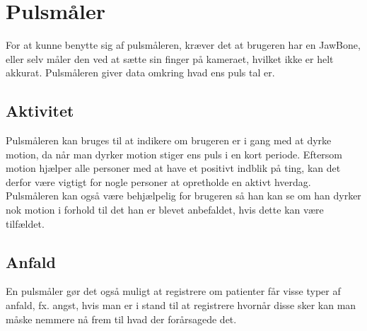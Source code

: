 \section{Pulsmåler}
For at kunne benytte sig af pulsmåleren, kræver det at brugeren har en JawBone, eller selv måler den ved at sætte sin finger på kameraet, hvilket ikke er helt akkurat.
Pulsmåleren giver data omkring hvad ens puls tal er.

\subsection{Aktivitet}
Pulsmåleren kan bruges til at indikere om brugeren er i gang med at dyrke motion, da når man dyrker motion stiger ens puls i en kort periode.
Eftersom motion hjælper alle personer med at have et positivt indblik på ting, kan det derfor være vigtigt for nogle personer at opretholde en aktivt hverdag.
Pulsmåleren kan også være behjælpelig for brugeren så han kan se om han dyrker nok motion i forhold til det han er blevet anbefaldet, hvis dette kan være tilfældet.

\subsection{Anfald}
En pulsmåler gør det også muligt at registrere om patienter får visse typer af anfald, fx. angst, hvis man er i stand til at registrere hvornår disse sker kan man måske nemmere nå frem til hvad der forårsagede det.

